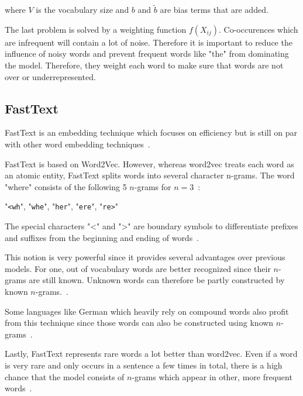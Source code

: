 where $V$ is the vocabulary size and $b$ and $\widetilde{b}$ are bias terms that are added.
\medskip

The last problem is solved by a weighting function $f(X_{ij})$. Co-occurences which are infrequent will contain a lot of noise. Therefore it is important to reduce the influence of noisy words and prevent frequent words like "the" from dominating the model. Therefore, they weight each word to make sure that words are not over or underrepresented.

\subsection{FastText}

FastText is an embedding technique which focuses on efficiency but is still on par with other word embedding techniques~\cite{Joulin2016}.
\medskip

FastText is based on Word2Vec. However, whereas word2vec treats each word as an atomic entity, FastText splits words into several character n-grams. The word "where" consists of the following 5 $n$-grams for $n=3$~\cite{Bojanowski2017}: 

\begin{center}
	"\verb|<wh|", "\verb|whe|", "\verb|her|", "\verb|ere|", "\verb|re>|"
\end{center}

The special characters "<" and ">" are boundary symbols to differentiate prefixes and suffixes from the beginning and ending of words~\cite{Bojanowski2017}.
\medskip

This notion is very powerful since it provides several advantages over previous models. For one, out of vocabulary words are better recognized since their $n$-grams are still known. Unknown words can therefore be partly constructed by known $n$-grams.~\cite{Bojanowski2017}. 
\medskip

Some languages like German which heavily rely on compound words also profit from this technique since those words can also be constructed using known $n$-grams~\cite{Bojanowski2017}.
\medskip

Lastly, FastText represents rare words a lot better than word2vec. Even if a word is very rare and only occurs in a sentence a few times in total, there is a high chance that the model consists of $n$-grams which appear in other, more frequent words~\cite{Bojanowski2017}.

